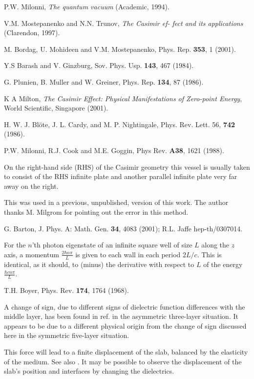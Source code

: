 \documentclass[prl,nofootinbib,twocolumn,showpacs]{revtex4}
\begin{document}
\begin{thebibliography}{99}
 P.W. Milonni, {\it The quantum vacuum} (Academic, 1994).

 V.M. Mostepanenko and N.N. Trunov, {\it The Casimir ef-
fect and its applications} (Clarendon, 1997).

  M. Bordag, U. Mohideen and V.M. Mostepanenko, Phys.
Rep. {\bf 353}, 1 (2001).

 Y.S Barash and V. Ginzburg, Sov. Phys. Usp. {\bf 143}, 467 (1984).

 G. Plunien, B. Muller and W. Greiner, Phys. Rep. {\bf 134}, 87 (1986).

 K A Milton,  {\it The Casimir Effect: Physical Manifestations of Zero-point Energy}, World Scientific, Singapore (2001).

 H. W. J. Bl\"{o}te, J. L. Cardy, and M. P. Nightingale,
Phys. Rev. Lett. 56, {\bf 742} (1986).

 P.W. Milonni, R.J. Cook and M.E. Goggin, Phys Rev.
{\bf A38}, 1621 (1988).

 On the right-hand side (RHS) of the Casimir geometry this vessel is usually taken to consist of the RHS infinite plate and another parallel infinite plate very far away on the right.

 This was used in a previous, unpublished, version of this work.
The author thanks M. Milgrom for pointing out the error in this method.

 G. Barton, J. Phys. A: Math. Gen. {\bf 34}, 4083 (2001); R.L. Jaffe hep-th/0307014.

 For the $n$'th photon eigenstate of an infinite  square well of size $L$ along
the $z$ axis, a momentum $\frac{2 \hbar n \pi}{L}$ is given to each wall in each period
$2L/c$. This is identical, as it should, to (minus) the derivative with respect to $L$ of
the energy
$\frac{ \hbar cn \pi}{L}$.



 T.H. Boyer, Phys. Rev. {\bf 174}, 1764 (1968).

 A change of sign, due to different signs of dielectric function differences with the middle layer, has been found in ref. \cite{Dzy} in the asymmetric three-layer situation. It appears to be due to a different physical origin from the change of sign discussed here in the symmetric five-layer situation.


 This force will lead to a finite displacement of the slab,  balanced by
the elasticity of the medium. See also \cite{Lifshitz,Dzy,Lev}. It may be possible to observe the displacement of the slab's position and  interfaces by changing the dielectrics. 


\end{thebibliography}
\end{document}
